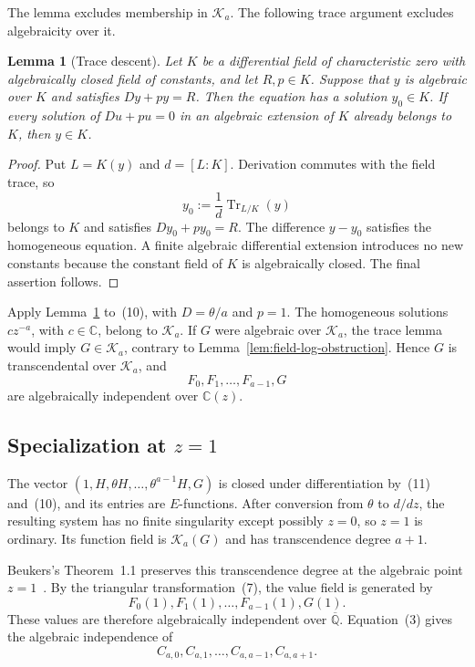 \documentclass[12pt]{article}
\newtheorem{lemma}[theorem]{Lemma}
\begin{document}
The lemma excludes membership in $\mathcal K_a$. The following trace argument excludes algebraicity over it.

\begin{lemma}[Trace descent]
\label{lem:trace-descent}
Let $K$ be a differential field of characteristic zero with algebraically closed field of constants, and let $R,p\in K$. Suppose that $y$ is algebraic over $K$ and satisfies $Dy+py=R$. Then the equation has a solution $y_0\in K$. If every solution of $Du+pu=0$ in an algebraic extension of $K$ already belongs to $K$, then $y\in K$.
\end{lemma}

\begin{proof}
Put $L=K(y)$ and $d=[L:K]$. Derivation commutes with the field trace, so
\[
y_0:=\frac1d\operatorname{Tr}_{L/K}(y)
\]
belongs to $K$ and satisfies $Dy_0+py_0=R$. The difference $y-y_0$ satisfies the homogeneous equation. A finite algebraic differential extension introduces no new constants because the constant field of $K$ is algebraically closed. The final assertion follows.
\end{proof}

Apply Lemma~\ref{lem:trace-descent} to~(10), with $D=\theta/a$ and $p=1$. The homogeneous solutions $cz^{-a}$, with $c\in\mathbb C$, belong to $\mathcal K_a$. If $G$ were algebraic over $\mathcal K_a$, the trace lemma would imply $G\in\mathcal K_a$, contrary to Lemma~\ref{lem:field-log-obstruction}. Hence $G$ is transcendental over $\mathcal K_a$, and
\[
F_0,F_1,\ldots,F_{a-1},G
\tag{14}
\]
are algebraically independent over $\mathbb C(z)$.

\subsection{Specialization at \texorpdfstring{$z=1$}{z=1}}

The vector $(1,H,\theta H,\ldots,\theta^{a-1}H,G)$ is closed under differentiation by~(11) and~(10), and its entries are $E$-functions. After conversion from $\theta$ to $d/dz$, the resulting system has no finite singularity except possibly $z=0$, so $z=1$ is ordinary. Its function field is $\mathcal K_a(G)$ and has transcendence degree $a+1$.

Beukers's Theorem~1.1 preserves this transcendence degree at the algebraic point $z=1$~\cite[Theorem~1.1]{beukers}. By the triangular transformation~(7), the value field is generated by
\[
F_0(1),F_1(1),\ldots,F_{a-1}(1),G(1).
\]
These values are therefore algebraically independent over $\overline{\mathbb Q}$. Equation~(3) gives the algebraic independence of
\[
C_{a,0},C_{a,1},\ldots,C_{a,a-1},C_{a,a+1}.
\tag{15}
\]
\end{document}

